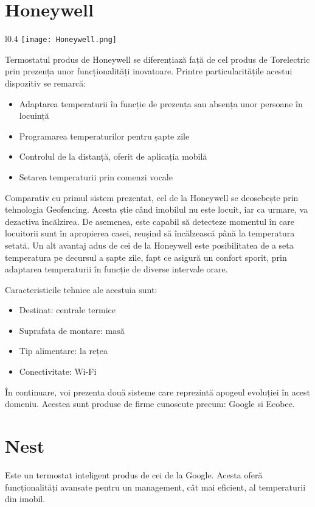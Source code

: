 \section{Honeywell}
\begin{wrapfigure}{l}{0.4\textwidth} 
\centering
\texttt{[image: Honeywell.png]}
\end{wrapfigure}
	Termostatul produs de Honeywell se diferențiază față de cel produs de Torelectric prin prezența unor funcționalități inovatoare. Printre particularitățile acestui dispozitiv se remarcă:
	\begin{itemize}
	\setlength{\itemindent}{2em}
		\itemsep0em
		\item Adaptarea temperaturii în funcție de prezența sau absența unor persoane în locuință 
		\item Programarea temperaturilor pentru șapte zile
		\item Controlul de la distanță, oferit de aplicația mobilă
		\item Setarea temperaturii prin comenzi vocale
	\end{itemize}

	Comparativ cu primul sistem prezentat, cel de la Honeywell se deosebește prin tehnologia Geofencing. Acesta știe când imobilul nu este locuit, iar ca urmare, va dezactiva încălzirea. De asemenea, este capabil să detecteze momentul în care locuitorii sunt în apropierea casei, reușind să încălzească până la temperatura setată.
	Un alt avantaj adus de cei de la Honeywell este posibilitatea de a seta temperatura pe decursul a șapte zile, fapt ce asigură un confort sporit, prin adaptarea temperaturii în funcție de diverse intervale orare.

	Caracteristicile tehnice ale acestuia sunt:
	\begin{itemize}
	\setlength{\itemindent}{2em}
		\itemsep0em
		\item Destinat: centrale termice
		\item Suprafata de montare: masă
		\item Tip alimentare: la rețea
		\item Conectivitate: Wi-Fi
	\end{itemize}

	În continuare, voi prezenta două sisteme care reprezintă apogeul evoluției în acest domeniu. Acestea sunt produse de firme cunoscute precum: Google si Ecobee.

\section{Nest}
	Este un termostat inteligent produs de cei de la Google. Acesta oferă funcționalități avansate pentru un management, cât mai eficient, al temperaturii din imobil. 

